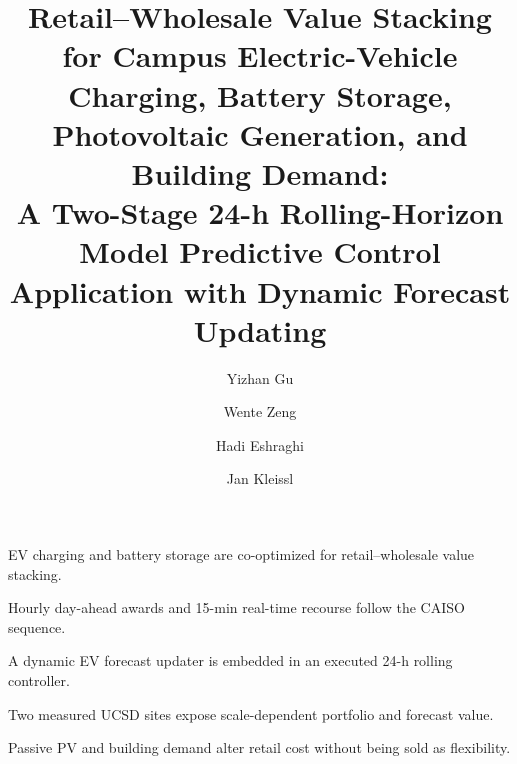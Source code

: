 \documentclass[final,5p,times]{elsarticle}
\begin{document}
\begin{frontmatter}

\title{Retail--Wholesale Value Stacking for Campus Electric-Vehicle Charging, Battery Storage, Photovoltaic Generation, and Building Demand: \\
A Two-Stage 24-h Rolling-Horizon Model Predictive Control Application with Dynamic Forecast Updating}

\author[ucsd]{Yizhan Gu}
\author[totalenergies]{Wente Zeng}
\author[totalenergies]{Hadi Eshraghi}
\author[ucsd]{Jan Kleissl}


\begin{highlights}
\item EV charging and battery storage are co-optimized for retail--wholesale value stacking.
\item Hourly day-ahead awards and 15-min real-time recourse follow the CAISO sequence.
\item A dynamic EV forecast updater is embedded in an executed 24-h rolling controller.
\item Two measured UCSD sites expose scale-dependent portfolio and forecast value.
\item Passive PV and building demand alter retail cost without being sold as flexibility.
\end{highlights}


\end{frontmatter}
\end{document}
